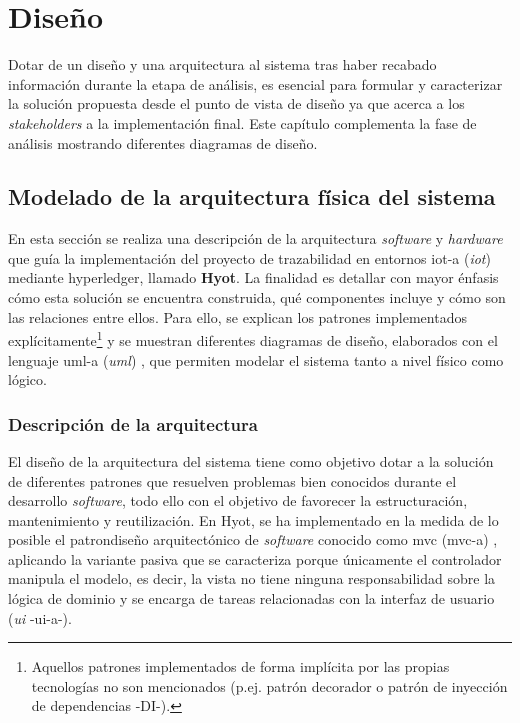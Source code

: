 \documentclass[12pt,a4paper, twoside]{report}
\begin{document}
	\chapter{Diseño} \label{designChapter}
	
	Dotar de un diseño y una arquitectura al sistema tras haber recabado información durante la etapa de análisis, es esencial para formular y caracterizar la solución propuesta desde el punto de vista de diseño ya que acerca a los \textit{\glspl{stakeholder}} a la implementación final. Este capítulo complementa la fase de análisis mostrando diferentes diagramas de diseño. 
	
	\section{Modelado de la arquitectura física del sistema}
	
	En esta sección se realiza una descripción de la arquitectura \textit{software} y \textit{hardware} que guía la implementación del proyecto de trazabilidad en entornos \gls{iot-a} (\textit{\gls{iot}}) mediante \gls{hyperledger}, llamado \textbf{Hyot}. La finalidad es detallar con mayor énfasis cómo esta solución se encuentra construida, qué componentes incluye y cómo son las relaciones entre ellos. Para ello, se explican los patrones implementados explícitamente\footnote{Aquellos patrones implementados de forma implícita por las propias tecnologías no son mencionados (p.ej. patrón decorador o patrón de inyección de dependencias -DI-).} y se muestran diferentes diagramas de diseño, elaborados con el lenguaje \gls{uml-a} (\textit{\gls{uml}}) \cite{uml}, que permiten modelar el sistema tanto a nivel físico como lógico.
		
	\subsection{Descripción de la arquitectura}\label{architectureDescription}
	
	El diseño de la arquitectura del sistema tiene como objetivo dotar a la solución de diferentes patrones que resuelven problemas bien conocidos durante el desarrollo \textit{software}, todo ello con el objetivo de favorecer la estructuración, mantenimiento y reutilización. En Hyot, se ha implementado en la medida de lo posible el \gls{patrondiseño} arquitectónico de \textit{software} conocido como \gls{mvc} (\gls{mvc-a}) \cite{buschmann:mvc}, aplicando la variante pasiva que se caracteriza porque únicamente el controlador manipula el modelo, es decir, la vista no tiene ninguna responsabilidad sobre la lógica de dominio y se encarga de tareas relacionadas con la interfaz de usuario (\textit{\gls{ui}} -\gls{ui-a}-). \\
	
\end{document}
